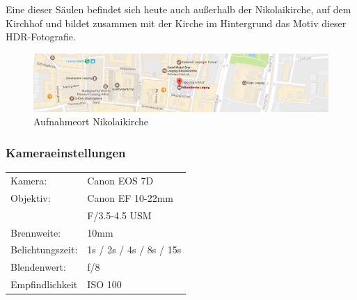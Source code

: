 \documentclass[liststotoc,bibtotoc,fontsize=14pt,]{scrreprt}
\begin{document}
\bigskip
Eine dieser Säulen befindet sich heute auch außerhalb der Nikolaikirche, auf dem Kirchhof und bildet zusammen mit der Kirche im Hintergrund das Motiv dieser HDR-Fotografie.

\begin{figure}[H]
	\includegraphics[width=\linewidth]{img/places/nikolai_map.jpg}
	\caption{Aufnahmeort Nikolaikirche}
	\label{img:ak_map}
\end{figure}

\subsubsection{Kameraeinstellungen}
\begin{minipage}{0.58\textwidth}
	\begin{tabular}{ll}
		Kamera: &Canon EOS 7D \\
		Objektiv: &Canon EF 10-22mm \\
		& F/3.5-4.5 USM\\		
		Brennweite:&  10mm \\
		Belichtungszeit: & 1s / 2s / 4s / 8s / 15s \\
		Blendenwert: & f/8\\
		Empfindlichkeit & ISO 100\\
	\end{tabular}\\
\end{minipage}%
\begin{minipage}{0.42\textwidth}
	
\end{minipage}%
\end{document}
